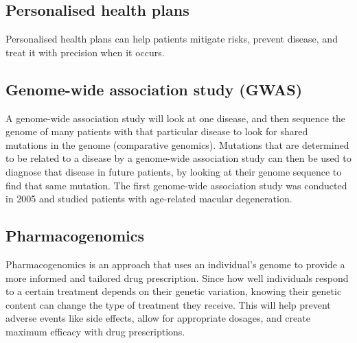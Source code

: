 \documentclass[11pt]{article}
\begin{document}
\subsection{Personalised health plans}
\label{sec:orgc71890f}
Personalised health plans can help patients mitigate risks, prevent disease, and treat it with precision when it occurs.

\newpage

\subsection{Genome-wide association study (GWAS)}
\label{sec:org5ead671}
A genome-wide association study will look at one disease, and then sequence the genome of many patients with that particular disease to look for shared mutations in the genome (comparative genomics). Mutations that are determined to be related to a disease by a genome-wide association study can then be used to diagnose that disease in future patients, by looking at their genome sequence to find that same mutation. The first genome-wide association study was conducted in 2005 and studied patients with age-related macular degeneration.

\subsection{Pharmacogenomics}
\label{sec:orgd21b28c}
Pharmacogenomics is an approach that uses an individual's genome to provide a more informed and tailored drug prescription. Since how well individuals respond to a certain treatment depends on their genetic variation, knowing their genetic content can change the type of treatment they receive. This will help prevent adverse events like side effects, allow for appropriate dosages, and create maximum efficacy with drug prescriptions.
\end{document}
